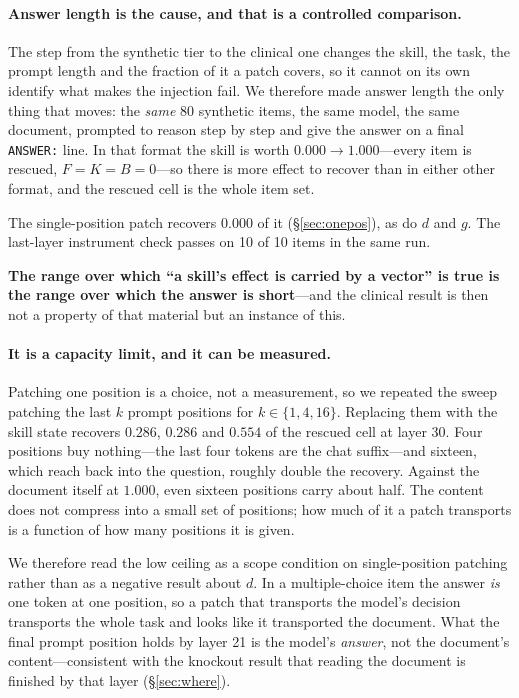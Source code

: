 \documentclass{article}
\newcommand{\dvec}{\ensuremath{d}}
\newcommand{\gvec}{\ensuremath{g}}
\begin{document}
\paragraph{Answer length is the cause, and that is a controlled comparison.}
The step from the synthetic tier to the clinical one changes the skill, the
task, the prompt length and the fraction of it a patch covers, so it cannot on
its own identify what makes the injection fail. We therefore made answer length
the only thing that moves: the \emph{same} 80 synthetic items, the same model,
the same document, prompted to reason step by step and give the answer on a
final \texttt{ANSWER:} line. In that format the skill is worth $0.000 \to
1.000$---every item is rescued, $F=K=B=0$---so there is more effect to recover
than in either other format, and the rescued cell is the whole item set.

The single-position patch recovers $\mathbf{0.000}$ of it
(\S\ref{sec:onepos}), as do $\dvec$ and $\gvec$. The last-layer
instrument check passes on 10 of 10 items in the same run.





\textbf{The range over which ``a skill's effect is carried by a vector'' is true
is the range over which the answer is short}---and the clinical result is then
not a property of that material but an instance of this.

\paragraph{It is a capacity limit, and it can be measured.} Patching one
position is a choice, not a measurement, so we repeated the sweep patching the
last $k$ prompt positions for $k \in \{1,4,16\}$. Replacing them with the skill
state recovers $0.286$, $0.286$ and $\mathbf{0.554}$ of the rescued cell at
layer 30. Four positions buy nothing---the last four tokens are the chat
suffix---and sixteen, which reach back into the question, roughly double the
recovery. Against the document itself at $1.000$, even sixteen positions carry
about half. The content does not compress into a small set of positions; how
much of it a patch transports is a function of how many positions it is given.

We therefore read the low ceiling as a scope condition on single-position
patching rather than as a negative result about $\dvec$. In a multiple-choice
item the answer \emph{is} one token at one position, so a patch that transports
the model's decision transports the whole task and looks like it transported the
document. What the final prompt position holds by layer 21 is the model's
\emph{answer}, not the document's content---consistent with the knockout result
that reading the document is finished by that layer (\S\ref{sec:where}).
\end{document}
